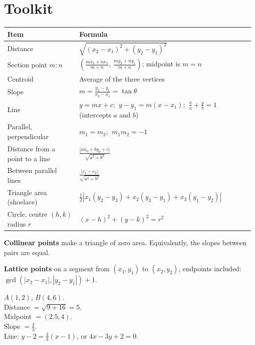 \documentclass[11pt,a4paper,openany]{report}
\begin{document}
\section{Toolkit}
\begin{center}\small
\begin{tabular}{>{\raggedright}p{4.6cm}>{\raggedright\arraybackslash}p{9.8cm}}
\toprule
Item & Formula\\\midrule
Distance & $\sqrt{(x_2-x_1)^2+(y_2-y_1)^2}$\\
Section point $m:n$ & $\left(\frac{mx_2+nx_1}{m+n},\ \frac{my_2+ny_1}{m+n}\right)$; midpoint is $m=n$\\
Centroid & Average of the three vertices\\
Slope & $m=\frac{y_2-y_1}{x_2-x_1}=\tan\theta$\\
Line & $y=mx+c$; $\ y-y_1=m(x-x_1)$; $\ \frac xa+\frac yb=1$ (intercepts $a$ and $b$)\\
Parallel, perpendicular & $m_1=m_2$; $\ m_1m_2=-1$\\
Distance from a point to a line & $\frac{|ax_0+by_0+c|}{\sqrt{a^2+b^2}}$\\
Between parallel lines & $\frac{|c_1-c_2|}{\sqrt{a^2+b^2}}$\\
Triangle area (shoelace) & $\frac12|x_1(y_2-y_3)+x_2(y_3-y_1)+x_3(y_1-y_2)|$\\
Circle, centre $(h,k)$ radius $r$ & $(x-h)^2+(y-k)^2=r^2$\\
\bottomrule
\end{tabular}
\end{center}

\textbf{Collinear points} make a triangle of zero area. Equivalently, the slopes between pairs are equal.

\textbf{Lattice points} on a segment from $(x_1,y_1)$ to $(x_2,y_2)$, endpoints included: $\gcd(|x_2-x_1|,|y_2-y_1|)+1$.

\begin{center}
\quad
\begin{minipage}[b]{6.8cm}\small
$A(1,2)$, $B(4,6)$.\\ Distance $=\sqrt{9+16}=5$.\\ Midpoint $=(2.5,4)$.\\ Slope $=\frac43$.\\ Line: $y-2=\frac43(x-1)$, or $4x-3y+2=0$.\\[10pt]
\end{minipage}
\end{center}
\end{document}
